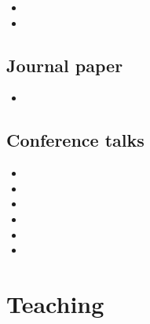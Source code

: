 \documentclass{scrartcl}
\begin{document}
\begin{itemize}
  \item {}
  \item {}
\end{itemize}

\subsection*{Journal paper}

\begin{itemize}
  \item {}
\end{itemize}

\subsection*{Conference talks}
\label{sec:Quelq-autr-expos}

\begin{itemize}
  \item {}
  \item {}
  \item {}
  \item {}
  \item {}
  \item {}
\end{itemize}




\section*{Teaching}
\label{sec:Teaching}
\end{document}
